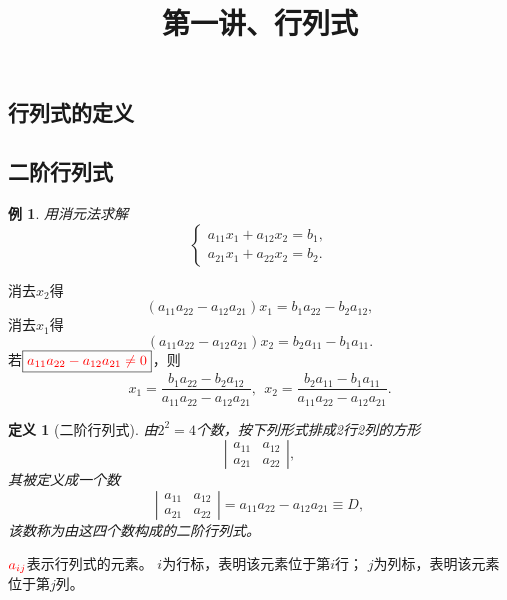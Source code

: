 \documentclass[10pt,a4paper%
tablecaptionabove]{article}
\renewcommand{\proofname}{\textbf{证明}}
\renewcommand{\figurename}{\textbf{图}}
\newcommand{\red}{\textcolor{red}}
\begin{document}
\begin{CJK}{UTF8}{gkai}
  \renewcommand{\proofname}{\textbf{证明}}
  \renewcommand{\figurename}{\textbf{图}}


  \newtheorem{li}{例}
  \newtheorem{jielun}{结论}
  \newtheorem{dingli}{定理}
  \newtheorem{mingti}{{命题}} 
  \newtheorem{yinli}{{引理}} 
  \newtheorem{tuilun}{{推论}}
  \newtheorem{dingyi}{{定义}} 
  \newtheorem{example}{{例}}
  \newtheorem*{example*}{{例}}
  \newtheorem*{jie}{{解}}
  \newtheorem*{zhengming}{{证明}}
  \newtheorem{zhu}{{注}}
  \newtheorem*{zhu*}{{注}}
  \newtheorem{xingzhi}{{性质}}
  \newtheorem{wenti}{{问题}}
  \newtheorem{rem}{{Remark}}
  \newtheorem{lem}{{Lemma}}
  \pagestyle{plain}


  \title{第一讲、行列式}
  \maketitle

  \section{行列式的定义}
  \subsection{二阶行列式}
  \begin{li}
    用消元法求解
    $$
    \left \lbrace
      \begin{array}{l}
        a_{11} x_1 + a_{12} x_2 = b_1, \\[0.2cm]
        a_{21} x_1 + a_{22} x_2 = b_2.
      \end{array}
    \right.
    $$
  \end{li}  
  消去$x_2$得
  $$
  (a_{11}a_{22}-a_{12}a_{21})x_1 = b_1 a_{22} - b_2 a_{12},
  $$
  消去$x_1$得
  $$
  (a_{11}a_{22}-a_{12}a_{21})x_2 = b_2 a_{11} - b_1 a_{11}.
  $$
  若$\boxed{\red{a_{11}a_{22}-a_{12}a_{21}\ne0}}$，则
  $$
  x_1 = \frac{b_1 a_{22} - b_2 a_{12}}{a_{11}a_{22}-a_{12}a_{21}}, \ \
  x_2 = \frac{b_2 a_{11} - b_1 a_{11}}{a_{11}a_{22}-a_{12}a_{21}}.
  $$

  \begin{dingyi}[二阶行列式]
    由$2^2=4$个数，按下列形式排成2行2列的方形
    $$
    \left|
      \begin{array}{cc}
        a_{11} & a_{12} \\[0.2cm]
        a_{21} & a_{22} 
      \end{array}
    \right|,
    $$
    其被定义成一个数
    $$
    \left|
      \begin{array}{cc}
        a_{11} & a_{12} \\[0.2cm]
        a_{21} & a_{22} 
      \end{array}
    \right| = a_{11}a_{22} - a_{12}a_{21} \equiv D,
    $$
    该数称为由这四个数构成的二阶行列式。
  \end{dingyi}
  $\red{a_{ij}}$表示行列式的元素。
  $i$为行标，表明该元素位于第$i$行；
  $j$为列标，表明该元素位于第$j$列。


\end{CJK}
\end{document}
